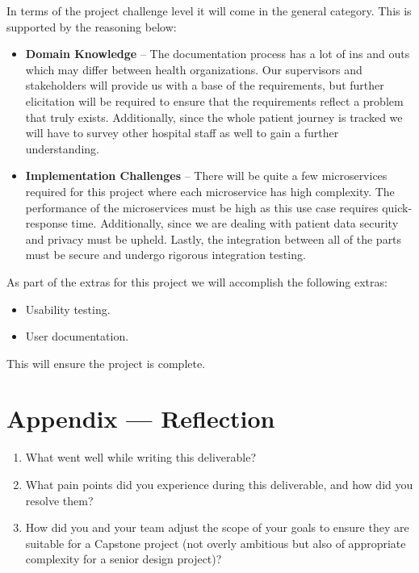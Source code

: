 \documentclass{article}
\begin{document}

In terms of the project challenge level it will come in the general category. This is supported by the reasoning below:

\begin{itemize}
    \item \textbf{Domain Knowledge} -- The documentation process has a lot of ins and outs which may differ between health organizations. Our supervisors and stakeholders will provide us with a base of the requirements, but further elicitation will be required to ensure that the requirements reflect a problem that truly exists. Additionally, since the whole patient journey is tracked we will have to survey other hospital staff as well to gain a further understanding.
    \item \textbf{Implementation Challenges} -- There will be quite a few microservices required for this project where each microservice has high complexity. The performance of the microservices must be high as this use case requires quick-response time. Additionally, since we are dealing with patient data security and privacy must be upheld. Lastly, the integration between all of the parts must be secure and undergo rigorous integration testing.
\end{itemize}

As part of the extras for this project we will accomplish the following extras:
\begin{itemize}
    \item Usability testing.
    \item User documentation.
\end{itemize}

This will ensure the project is complete.

\newpage{}

\section*{Appendix --- Reflection}




\begin{enumerate}
    \item What went well while writing this deliverable? 
    \item What pain points did you experience during this deliverable, and how
    did you resolve them?
    \item How did you and your team adjust the scope of your goals to ensure
    they are suitable for a Capstone project (not overly ambitious but also of
    appropriate complexity for a senior design project)?
\end{enumerate}  
\end{document}

